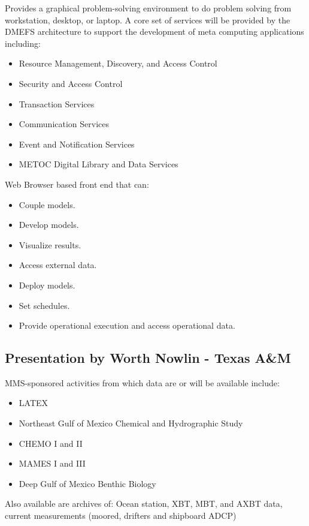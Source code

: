Provides a graphical problem-solving environment to do problem solving from workstation, 
desktop, or laptop. A core set of services will be provided by the DMEFS architecture to support 
the development of meta computing applications including:
\begin{itemize}
\item Resource Management, Discovery, and Access Control
\item Security and Access Control
\item Transaction Services
\item Communication Services
\item Event and Notification Services
\item METOC Digital Library and Data Services
\end{itemize}

Web Browser based front end that can:
\begin{itemize}
\item Couple models.
\item Develop models.
\item Visualize results.
\item Access external data. 
\item Deploy models.
\item Set schedules.
\item Provide operational execution and access operational data.
\end{itemize}

\subsection{Presentation by Worth Nowlin - Texas A\&M}

MMS-sponsored activities from which data are or will be available include:

\begin{itemize}
\item LATEX
\item Northeast Gulf of Mexico Chemical and Hydrographic Study
\item CHEMO I and II
\item MAMES I and III
\item Deep Gulf of Mexico Benthic Biology
\end{itemize}

Also available are archives of:
        Ocean station, XBT, MBT, and AXBT data, current measurements (moored, drifters and 
shipboard ADCP)

